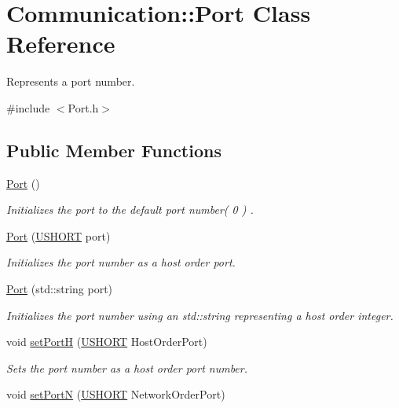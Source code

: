 \hypertarget{class_communication_1_1_port}{}\section{Communication\+:\+:Port Class Reference}
\label{class_communication_1_1_port}


Represents a port number.  




{\ttfamily \#include $<$Port.\+h$>$}

\subsection*{Public Member Functions}
\begin{DoxyCompactItemize}
\item 
\hyperlink{class_communication_1_1_port_a4663a9e8dcfa3d078930f83859c6eac8}{Port} ()
\begin{DoxyCompactList}\small\item\em Initializes the port to the default port number( 0 ) . \end{DoxyCompactList}\item 
\hyperlink{class_communication_1_1_port_a9f90d334dd5352c2df2b56d7e5b32017}{Port} (\hyperlink{typedefs_8h_a5b86282b5437f326bad1198f30248a54}{U\+S\+H\+O\+R\+T} port)
\begin{DoxyCompactList}\small\item\em Initializes the port number as a host order port. \end{DoxyCompactList}\item 
\hyperlink{class_communication_1_1_port_a8ed813f5c9fced98cde2f7a89fe10ffa}{Port} (std\+::string port)
\begin{DoxyCompactList}\small\item\em Initializes the port number using an std\+::string representing a host order integer. \end{DoxyCompactList}\item 
void \hyperlink{class_communication_1_1_port_afd0c88ba6c23c3a934ad019bb07dd465}{set\+Port\+H} (\hyperlink{typedefs_8h_a5b86282b5437f326bad1198f30248a54}{U\+S\+H\+O\+R\+T} Host\+Order\+Port)
\begin{DoxyCompactList}\small\item\em Sets the port number as a host order port number. \end{DoxyCompactList}\item 
void \hyperlink{class_communication_1_1_port_ab66ce0c328ca87872c8d2762a1445349}{set\+Port\+N} (\hyperlink{typedefs_8h_a5b86282b5437f326bad1198f30248a54}{U\+S\+H\+O\+R\+T} Network\+Order\+Port)

\end{DoxyCompactItemize}
